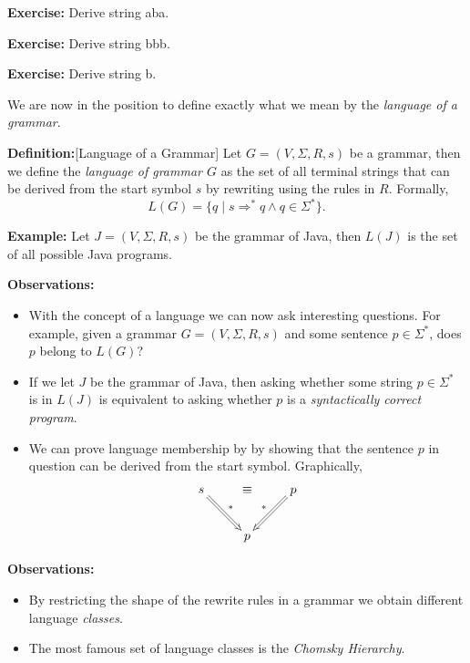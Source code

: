 \documentclass[a4paper,blends,pdf,colorBG,slideColor]{prosper}
\begin{document}
{\bf Exercise:} Derive string aba.

{\bf Exercise:} Derive string bbb.

{\bf Exercise:} Derive string b.

\es



\small
We are now in the position to define exactly what we mean by the {\em language of a grammar}.

\vspace{.2in}
{\bf Definition:}[Language of a Grammar] Let $G = (V,\Sigma,R,s)$ be a grammar, then we define the {\em language of
grammar $G$} as the set of all terminal strings that can be derived from the start symbol $s$ by rewriting
using the rules in $R$.  Formally,
\[
L(G) = \{ q \mid s \Rightarrow^* q \wedge q\in \Sigma^*\}.
\]

\vspace{.3in}
{\bf Example:} Let $J = (V,\Sigma,R,s)$ be the grammar of Java, then $L(J)$ is the set of all possible Java 
programs.
\es



\small
{\bf Observations:}  
\begin{itemize}
\item With the concept of a language we can now ask interesting questions.  For example,
given a grammar $G = (V,\Sigma,R,s)$ and some sentence $p\in \Sigma^*$, does $p$ belong to $L(G)$?
\item If we let $J$ be the grammar of Java, then asking whether some string $p\in \Sigma^*$ is in $L(J)$
is equivalent to asking whether $p$ is a {\em syntactically correct program}.
\item We can prove language membership by by showing that the 
sentence $p$ in question can be derived from the start symbol.  Graphically, 
{\scriptsize
\[
\xymatrix{
s \ar@{=>}[rd]^{*} &\equiv &p\ar@{=>}[ld]_{*}  \\
&p&
}
\]
}

\end{itemize}

\es



{\bf Observations:} 
\begin{itemize}
\item By restricting the shape of the rewrite rules in a grammar we obtain different language {\em classes}.
\item  The most famous set of language classes is the {\em Chomsky Hierarchy}.
\end{itemize}
\es
\end{document}
